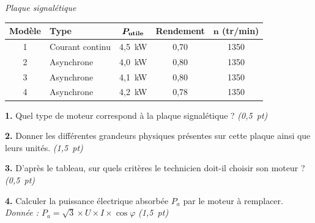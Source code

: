 \documentclass[11pt,a4paper]{article}
\renewcommand{\arraystretch}{1.8}
\newcommand{\cadreblanc}[1]{%
	\medskip\framebox[\linewidth][c]{%
		\rule{0mm}{#1mm}}\par
	\medskip}
\begin{document}
\begin{minipage}[h]{0.60\linewidth}
\begin{center}

		\textit{\small Plaque signalétique}
	\end{center}
\end{minipage}

\vspace{4mm}

\begin{center}
	\renewcommand{\arraystretch}{1.8}
	\begin{tabular}{|c|l|c|c|c|}
		\hline
		\textbf{Modèle} & \textbf{Type} & $\boldsymbol{P_{\rm utile}}$ & \textbf{Rendement} & $\boldsymbol{n}$ (tr/min) \\
		\hline
		1 & Courant continu & 4,5~kW & 0,70 & 1350 \\
		\hline
		2 & Asynchrone & 4,0~kW & 0,80 & 1350 \\
		\hline
		3 & Asynchrone & 4,1~kW & 0,80 & 1350 \\
		\hline
		4 & Asynchrone & 4,2~kW & 0,78 & 1350 \\
		\hline
	\end{tabular}
\end{center}

\vspace{5mm}

\textbf{1.} Quel type de moteur correspond à la plaque signalétique ? \hfill \textit{(0,5~pt)}

\cadreblanc{12}

\textbf{2.} Donner les différentes grandeurs physiques présentes sur cette plaque ainsi que leurs unités.
\hfill \textit{(1,5~pt)}

\cadreblanc{20}

\textbf{3.} D'après le tableau, sur quels critères le technicien doit-il choisir son moteur ?
\hfill \textit{(0,5~pt)}

\cadreblanc{14}

\textbf{4.} Calculer la puissance électrique absorbée $P_a$ par le moteur à remplacer.
\hfill \textit{Donnée : $P_a = \sqrt{3} \times U \times I \times \cos\varphi$}
\hfill \textit{(1,5~pt)}

\cadreblanc{18}
\end{document}

